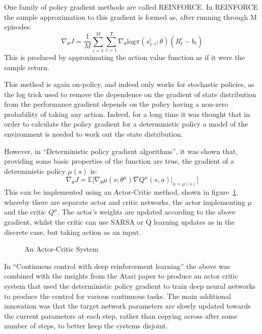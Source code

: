 One family of policy gradient methods are called REINFORCE. In REINFORCE the sample approximation to this gradient is formed as, after running through M episodes:
\begin{equation}
\nabla_\theta J = \frac{1}{M}\sum_{i=1}^M\sum_{t=1}^T\nabla_\theta  \text{log}\pi ( s_{1:t}^i ; \theta)(R^i_t - b_t)
\label{eq:Reinforce}
\end{equation}
This is produced by approximating the action value function as if it were the sample return.

This method is again on-policy, and indeed only works for stochastic policies, as the log trick used to remove the dependence on the gradient of state distribution from the performance gradient depends on the policy having a non-zero probability of taking any action. Indeed, for a long time it was thought that in order to calculate the policy gradient for a deterministic policy a model of the environment is needed to work out the state distribution.

However, in ``Deterministic policy gradient algorithms''\cite{silver2014deterministic}, it was shown that, providing some basic properties of the function are true, the gradient of a deterministic policy $\mu(s)$ is:
\begin{equation}
\nabla_\theta J =\mathbb{E}\big[ \nabla_\theta  \mu ( s ; \theta^\mu) \nabla Q^\mu (s,a)|_{a = \mu(s)}\big]
\end{equation}
This can be implemented using an Actor-Critic method, shown in figure~\ref{fig:actcrit}, whereby there are separate actor and critic networks, the actor implementing $\mu$ and the critic $Q^\mu$. The actor's weights are updated according to the above gradient, whilst the critic can use SARSA or Q learning updates as in the discrete case, but taking action as an input.


\begin{figure}
\centering

\caption{An Actor-Critic System}
\label{fig:actcrit}
\end{figure}



In ``Continuous control with deep reinforcement learning'' \cite{lillicrap2015continuous} the above was combined with the insights from the Atari paper \cite{atariDQN} to produce an actor critic system that used the deterministic policy gradient to train deep neural networks to produce the control for various continuous tasks. The main additional innovation was that the target network parameters are slowly updated towards the current parameters at each step, rather than copying across after some number of steps, to better keep the systems disjoint.

